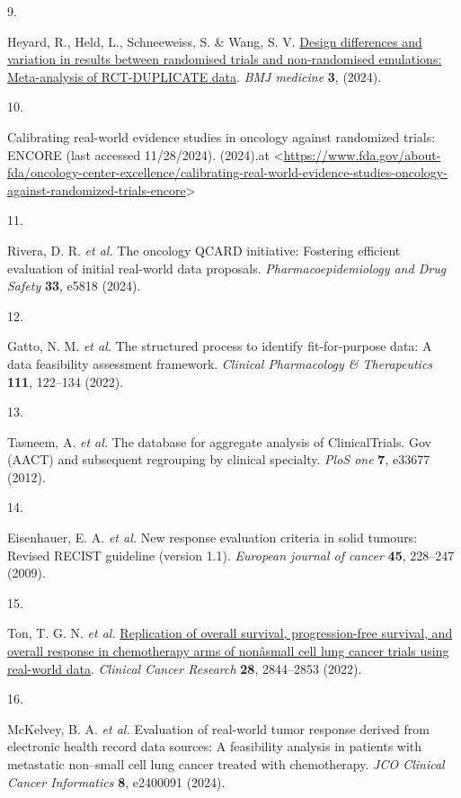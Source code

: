 \documentclass[
  letterpaper,
  DIV=11,
  numbers=noendperiod]{scrartcl}
\newlength{\cslhangindent}
\newlength{\csllabelwidth}
\newenvironment{CSLReferences}[2] %
 {\begin{list}{}{%
  \setlength{\itemindent}{0pt}
  \setlength{\leftmargin}{0pt}
  \setlength{\parsep}{0pt}
  \ifodd #1
   \setlength{\leftmargin}{\cslhangindent}
   \setlength{\itemindent}{-1\cslhangindent}
  \fi
  \setlength{\itemsep}{#2\baselineskip}}}
 {\end{list}}
\newcommand{\CSLLeftMargin}[1]{\parbox[t]{\csllabelwidth}{\strut#1\strut}}
\newcommand{\CSLRightInline}[1]{\parbox[t]{\linewidth - \csllabelwidth}{\strut#1\strut}}
\begin{document}
\begin{CSLReferences}{0}{0}
\CSLLeftMargin{9. }%
\CSLRightInline{Heyard, R., Held, L., Schneeweiss, S. \& Wang, S. V.
\href{https://doi.org/10.1136/bmjmed-2023-000709}{Design differences and
variation in results between randomised trials and non-randomised
emulations: Meta-analysis of RCT-DUPLICATE data}. \emph{BMJ medicine}
\textbf{3}, (2024).}

\CSLLeftMargin{10. }%
\CSLRightInline{Calibrating real-world evidence studies in oncology
against randomized trials: ENCORE (last accessed 11/28/2024). (2024).at
\textless{}\url{https://www.fda.gov/about-fda/oncology-center-excellence/calibrating-real-world-evidence-studies-oncology-against-randomized-trials-encore}\textgreater{}}

\CSLLeftMargin{11. }%
\CSLRightInline{Rivera, D. R. \emph{et al.} The oncology QCARD
initiative: Fostering efficient evaluation of initial real-world data
proposals. \emph{Pharmacoepidemiology and Drug Safety} \textbf{33},
e5818 (2024).}

\CSLLeftMargin{12. }%
\CSLRightInline{Gatto, N. M. \emph{et al.} The structured process to
identify fit-for-purpose data: A data feasibility assessment framework.
\emph{Clinical Pharmacology \& Therapeutics} \textbf{111}, 122--134
(2022).}

\CSLLeftMargin{13. }%
\CSLRightInline{Tasneem, A. \emph{et al.} The database for aggregate
analysis of ClinicalTrials. Gov (AACT) and subsequent regrouping by
clinical specialty. \emph{PloS one} \textbf{7}, e33677 (2012).}

\CSLLeftMargin{14. }%
\CSLRightInline{Eisenhauer, E. A. \emph{et al.} New response evaluation
criteria in solid tumours: Revised RECIST guideline (version 1.1).
\emph{European journal of cancer} \textbf{45}, 228--247 (2009).}

\CSLLeftMargin{15. }%
\CSLRightInline{Ton, T. G. N. \emph{et al.}
\href{https://doi.org/10.1158/1078-0432.CCR-22-0471}{Replication of
overall survival, progression-free survival, and overall response in
chemotherapy arms of nonâsmall cell lung cancer trials using real-world
data}. \emph{Clinical Cancer Research} \textbf{28}, 2844--2853 (2022).}

\CSLLeftMargin{16. }%
\CSLRightInline{McKelvey, B. A. \emph{et al.} Evaluation of real-world
tumor response derived from electronic health record data sources: A
feasibility analysis in patients with metastatic non--small cell lung
cancer treated with chemotherapy. \emph{JCO Clinical Cancer Informatics}
\textbf{8}, e2400091 (2024).}


\end{CSLReferences}
\end{document}
